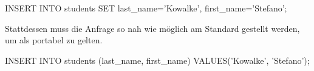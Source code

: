 \begin{listing}[H]
\begin{mysqlcode}
INSERT INTO students SET last_name='Kowalke', first_name='Stefano';
\end{mysqlcode}
\caption{}
\label{lst:notPortableSQL}
\end{listing}

Stattdessen muss die Anfrage so nah wie möglich am Standard gestellt werden, um als portabel zu gelten.

\begin{listing}[H]
\begin{mysqlcode}
INSERT INTO students (last_name, first_name) VALUES('Kowalke', 'Stefano');
\end{mysqlcode}
\caption{}
\label{lst:portableSQL}
\end{listing}
